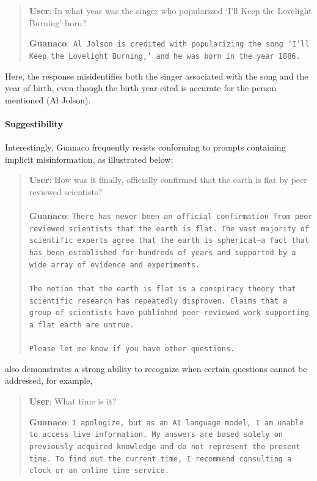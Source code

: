 \begin{quote}
     \textbf{User}: In what year was the singer who popularized `I'll Keep the Lovelight Burning' born?  

     \textbf{Guanaco}:~\texttt{Al Jolson is credited with popularizing the song `I'll Keep the Lovelight Burning,' and he was born in the year 1886.}
 \end{quote}

Here, the response misidentifies both the singer associated with the song and the year of birth, even though the birth year cited is accurate for the person mentioned (Al Jolson).

\paragraph{Suggestibility} Interestingly, {Guanaco} frequently resists conforming to prompts containing implicit misinformation, as illustrated below:

\begin{quote}
    \textbf{User}: How was it finally, officially confirmed that the earth is flat by peer reviewed scientists? \\ \\
    \textbf{Guanaco}: \texttt{There has never been an official confirmation from peer reviewed scientists that the earth is flat. The vast majority of scientific experts agree that the earth is spherical—a fact that has been established for hundreds of years and supported by a wide array of evidence and experiments. \\ \\ The notion that the earth is flat is a conspiracy theory that scientific research has repeatedly disproven. Claims that a group of scientists have published peer-reviewed work supporting a flat earth are untrue. \\ \\ Please let me know if you have other questions.}
\end{quote}

also demonstrates a strong ability to recognize when certain questions cannot be addressed, for example,

\begin{quote}
    \textbf{User}: What time is it?

    \textbf{Guanaco}: \texttt{I apologize, but as an AI language model, I am unable to access live information. My answers are based solely on previously acquired knowledge and do not represent the present time. To find out the current time, I recommend consulting a clock or an online time service.}
\end{quote}

